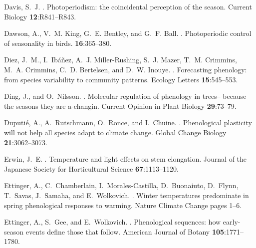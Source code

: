 \documentclass{article}
\begin{document}
\begin{thebibliography}{131}
Davis, S.~J.
.
\newblock Photoperiodism: the coincidental perception of the season.
\newblock Current Biology {\bf 12}:R841--R843.

Dawson, A., V.~M. King, G.~E. Bentley, and G.~F. Ball.
.
\newblock Photoperiodic control of seasonality in birds.
 {\bf 16}:365--380.

Diez, J.~M., I.~Ib{\'a}{\~n}ez, A.~J. Miller-Rushing, S.~J. Mazer, T.~M.
  Crimmins, M.~A. Crimmins, C.~D. Bertelsen, and D.~W. Inouye.
.
\newblock Forecasting phenology: from species variability to community
  patterns.
\newblock Ecology Letters {\bf 15}:545--553.

Ding, J., and O.~Nilsson.
.
\newblock Molecular regulation of phenology in trees-- because the seasons they
  are a-changin.
\newblock Current Opinion in Plant Biology {\bf 29}:73--79.

Duputi{\'e}, A., A.~Rutschmann, O.~Ronce, and I.~Chuine.
.
\newblock Phenological plasticity will not help all species adapt to climate
  change.
\newblock Global Change Biology {\bf 21}:3062--3073.

Erwin, J.~E.
.
\newblock Temperature and light effects on stem elongation.
\newblock Journal of the Japanese Society for Horticultural Science {\bf
  67}:1113--1120.

Ettinger, A., C.~Chamberlain, I.~Morales-Castilla, D.~Buonaiuto, D.~Flynn,
  T.~Savas, J.~Samaha, and E.~Wolkovich.
.
\newblock Winter temperatures predominate in spring phenological responses to
  warming.
\newblock Nature Climate Change pages 1--6.

Ettinger, A., S.~Gee, and E.~Wolkovich.
.
\newblock Phenological sequences: how early-season events define those that
  follow.
\newblock American Journal of Botany {\bf 105}:1771--1780.


\end{thebibliography}
\end{document}
